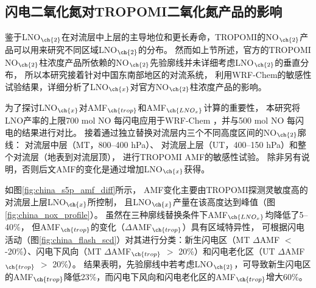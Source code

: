 \subsection{闪电二氧化氮对TROPOMI二氧化氮产品的影响} \label{sec:lno2_affects_tropomi}

鉴于LNO$_{\ch{2}}$在对流层中上层的主导地位和更长寿命，TROPOMI的NO$_{\ch{2}}$产品可以用来研究不同区域LNO$_{\ch{2}}$的分布。
然而如上节所述，官方的TROPOMI NO$_{\ch{2}}$柱浓度产品所依赖的NO$_{\ch{2}}$先验廓线并未详细考虑LNO$_{\ch{2}}$的垂直分布，
所以本研究接着针对中国东南部地区的对流系统，
利用WRF-Chem的敏感性试验结果，详细分析了LNO$_{\ch{x}}$对官方NO$_{\ch{2}}$柱浓度产品的影响。

为了探讨LNO$_{\ch{x}}$对AMF$_{\ch{trop}}$和AMF$_{\ch{LNO_x}}$计算的重要性，
本研究将LNO产率的上限700 mol NO 每闪电\citep{Ott.2010}应用于WRF-Chem ，并与500 mol NO 每闪电的结果进行对比。
接着通过独立替换对流层内三个不同高度区间的NO$_{\ch{2}}$廓线：
对流层中层（MT，800--400 hPa）、
对流层上层（UT，400--150 hPa）和整个对流层（地表到对流层顶），
进行TROPOMI AMF的敏感性试验。
除非另有说明，否则后文AMF的变化是通过增加LNO$_{\ch{x}}$获得。

如图\ref{fig:china_s5p_amf_diff}所示，
AMF变化主要由TROPOMI探测灵敏度高的对流层上层LNO$_{\ch{x}}$所控制\citep{Beirle.2009,Laughner.2017}，
且LNO$_{\ch{x}}$产量在该高度达到峰值（图\ref{fig:china_nox_profile}）。
虽然在三种廓线替换条件下AMF$_{\ch{LNO_x}}$均降低了5--40\%，
但AMF$_{\ch{trop}}$的变化（$\Delta$AMF$_{\ch{trop}}$）具有区域特异性，
可根据闪电活动（图\ref{fig:china_flash_scd}）对其进行分类：新生闪电区（MT $\Delta$AMF $<$ -20\%）、闪电下风向（MT $\Delta$AMF$_{\ch{trop}}$ $>$ 20\%）和闪电老化区（UT $\Delta$AMF$_{\ch{trop}}$ $>$ 20\%）。
结果表明，先验廓线中若考虑LNO$_{\ch{2}}$，可导致新生闪电区的AMF$_{\ch{trop}}$降低23\%，而闪电下风向和闪电老化区的AMF$_{\ch{trop}}$增大60\%。

